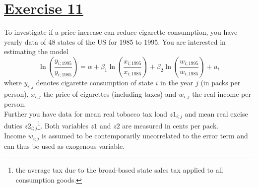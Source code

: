 \documentclass[captions=tableheading, 12pt, headings=small, parskip=half]{scrartcl}
\begin{document}
\section*{\underline{Exercise 11}}

To investigate if a price increase can reduce cigarette consumption, you have yearly data of 48 states of the US for 1985 to 1995. You are interested in estimating the model
\[
\ln\left(\frac{y_{i; 1995}}{y_{i; 1985}}\right) = \alpha + \beta_1\ln\left(\frac{x_{i; 1995}}{x_{i; 1985}}\right) + \beta_2\ln\left(\frac{w_{i; 1995}}{w_{i; 1985}}\right) + u_i 
\]
where $y_{i; j}$ denotes cigarette consumption of state $i$ in the year $j$ (in packs per person), $x_{i; j}$ the price of cigarettes (including taxes) and $w_{i; j}$ the real income per person.\\
Further you have data for mean real tobacco tax load $z1_{i;j}$ and mean real excise duties $z2_{i;j}$\footnote{the average tax due to the broad-based state sales tax applied to all consumption goods.}. Both variables $z1$ and $z2$ are measured in cents per pack.\\
Income $w_{i; j}$ is assumed to be contemporarily uncorrelated to the error term and can thus be used as exogenous variable.
\end{document}

